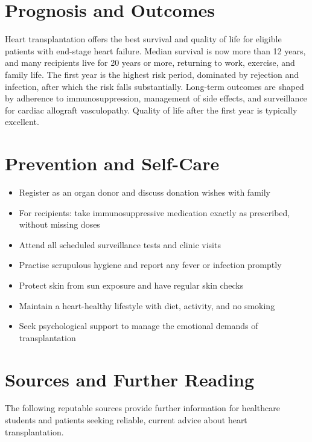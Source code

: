 \section*{Prognosis and Outcomes}
Heart transplantation offers the best survival and quality of life for eligible patients with end-stage heart failure. Median survival is now more than 12 years, and many recipients live for 20 years or more, returning to work, exercise, and family life. The first year is the highest risk period, dominated by rejection and infection, after which the risk falls substantially. Long-term outcomes are shaped by adherence to immunosuppression, management of side effects, and surveillance for cardiac allograft vasculopathy. Quality of life after the first year is typically excellent.

\section*{Prevention and Self-Care}
\begin{itemize}
    \item Register as an organ donor and discuss donation wishes with family
    \item For recipients: take immunosuppressive medication exactly as prescribed, without missing doses
    \item Attend all scheduled surveillance tests and clinic visits
    \item Practise scrupulous hygiene and report any fever or infection promptly
    \item Protect skin from sun exposure and have regular skin checks
    \item Maintain a heart-healthy lifestyle with diet, activity, and no smoking
    \item Seek psychological support to manage the emotional demands of transplantation
\end{itemize}

\section*{Sources and Further Reading}
The following reputable sources provide further information for healthcare students and patients seeking reliable, current advice about heart transplantation.

